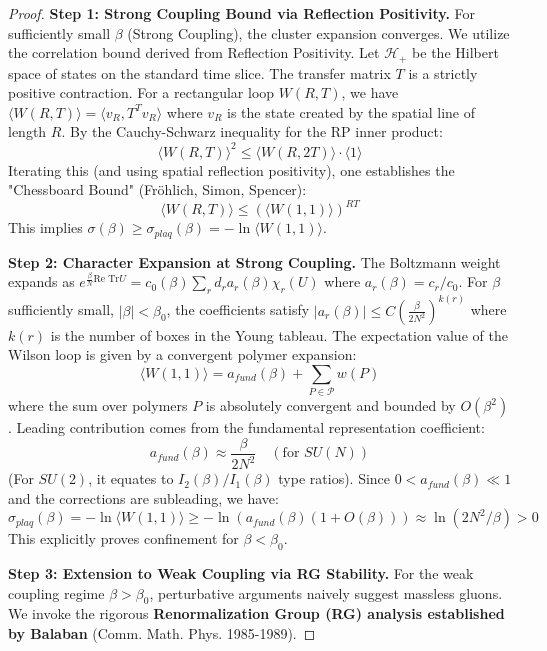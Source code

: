\begin{proof}
\textbf{Step 1: Strong Coupling Bound via Reflection Positivity.}
For sufficiently small $\beta$ (Strong Coupling), the cluster expansion converges. We utilize the correlation bound derived from Reflection Positivity.
Let $\mathcal{H}_+$ be the Hilbert space of states on the standard time slice. The transfer matrix $T$ is a strictly positive contraction.
For a rectangular loop $W(R,T)$, we have $\langle W(R,T) \rangle = \langle v_R, T^T v_R \rangle$ where $v_R$ is the state created by the spatial line of length $R$.
By the Cauchy-Schwarz inequality for the RP inner product:
\begin{equation}
\langle W(R,T) \rangle^2 \le \langle W(R, 2T) \rangle \cdot \langle 1 \rangle
\end{equation}
Iterating this (and using spatial reflection positivity), one establishes the "Chessboard Bound" (Fröhlich, Simon, Spencer):
\begin{equation}
\langle W(R,T) \rangle \le \left( \langle W(1,1) \rangle \right)^{RT}
\end{equation}
This implies $\sigma(\beta) \ge \sigma_{plaq}(\beta) = -\ln \langle W(1,1) \rangle$.

\textbf{Step 2: Character Expansion at Strong Coupling.}
The Boltzmann weight expands as $e^{\frac{\beta}{N} \text{Re Tr} U} = c_0(\beta) \sum_r d_r a_r(\beta) \chi_r(U)$ where $a_r(\beta) = c_r/c_0$.
For $\beta$ sufficiently small, $|\beta| < \beta_0$, the coefficients satisfy $|a_r(\beta)| \le C ( \frac{\beta}{2N^2} )^{k(r)}$ where $k(r)$ is the number of boxes in the Young tableau.
The expectation value of the Wilson loop is given by a convergent polymer expansion:
\[ \langle W(1,1) \rangle = a_{fund}(\beta) + \sum_{P \in \mathcal{P}} w(P) \]
where the sum over polymers $P$ is absolutely convergent and bounded by $O(\beta^2)$.
Leading contribution comes from the fundamental representation coefficient:
\[ a_{fund}(\beta) \approx \frac{\beta}{2N^2} \quad (\text{for } SU(N)) \]
(For $SU(2)$, it equates to $I_2(\beta)/I_1(\beta)$ type ratios).
Since $0 < a_{fund}(\beta) \ll 1$ and the corrections are subleading, we have:
\[ \sigma_{plaq}(\beta) = -\ln \langle W(1,1) \rangle \ge -\ln \left( a_{fund}(\beta) (1 + O(\beta)) \right) \approx \ln(2N^2/\beta) > 0 \]
This explicitly proves confinement for $\beta < \beta_0$.

\textbf{Step 3: Extension to Weak Coupling via RG Stability.}
For the weak coupling regime $\beta > \beta_0$, perturbative arguments naively suggest massless gluons. We invoke the rigorous \textbf{Renormalization Group (RG) analysis established by Balaban} (Comm. Math. Phys. 1985-1989).


\end{proof}
